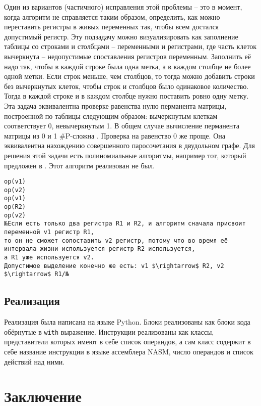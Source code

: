 \documentclass[a4paper,14pt]{extarticle}
\begin{document}
Один из вариантов (частичного) исправления этой проблемы -- это в момент, когда алгоритм не справляется таким образом,
определить, как можно переставить регистры в живых переменных так, чтобы всем достался допустимый регистр.
Эту подзадачу можно визуализировать как заполнение таблицы со строками и столбцами -- переменными и регистрами,
где часть клеток вычеркнута -- недопустимые споставления регистров переменным.
Заполнить её надо так, чтобы в каждой строке была одна метка, а в каждом столбце не более одной метки.
Если строк меньше, чем столбцов, то тогда можно добавить строки без вычеркнутых клеток, чтобы строк и столбцов было одинаковое количество.
Тогда в каждой строке и в каждом столбце нужно поставить ровно одну метку.
Эта задача эквивалентна проверке равенства нулю перманента матрицы, построенной по таблицы следующим образом:
вычеркнутым клеткам соответствует 0, невычеркнутым 1.
В общем случае вычисление перманента матрицы из 0 и 1 \#P-сложна \cite{valiant_complexity_1979}.
Проверка на равенство 0 же проще.
Она эквивалентна нахождению совершенного паросочетания в двудольном графе.
Для решения этой задачи есть полиномиальные алгоритмы, например тот, который предложен в \cite{chandran_practical_2011}.
Этот алгоритм реализован не был.

\begin{lstlisting}[caption={Пример кода, в котором алгоритм может не справится}, label=fail_when_possible]
op(v1)
op(v2)
op(v1)
op(R2)
op(v2)
№Если есть только два регистра R1 и R2, и алгоритм сначала присвоит переменной v1 регистр R1,
то он не сможет сопоставить v2 регистр, потому что во время её интервала жизни используется регистр R2 используется,
а R1 уже используется v2.
Допустимое выделение конечно же есть: v1 $\rightarrow$ R2, v2 $\rightarrow$ R1/№
\end{lstlisting}

\subsection{Реализация}
Реализация была написана на языке Python.
Блоки реализованы как блоки кода обёрнутые в \texttt{with} выражение.
Инструкции реализованы как классы, представители которых имеют в себе список операндов,
а сам класс содержит в себе название инструкции в языке ассемблера NASM, число операндов и список действий над ними.

\section{Заключение}

\newpage



\end{document}
